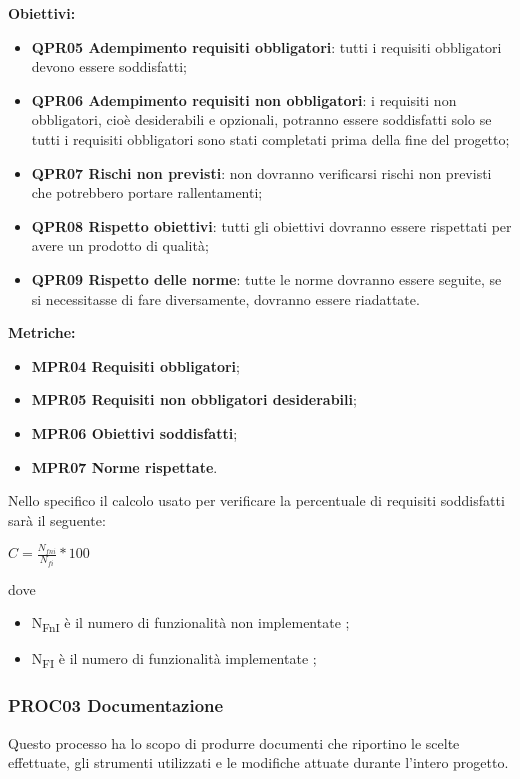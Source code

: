 \documentclass[../piano_di_qualifica.tex]{subfiles}
\begin{document}
\textbf{Obiettivi:}
\smallbreak
\begin{itemize}
	\item \textbf{QPR05 Adempimento requisiti obbligatori}: tutti i requisiti obbligatori devono essere soddisfatti;
	\item \textbf{QPR06 Adempimento requisiti non obbligatori}: i requisiti non obbligatori, cioè desiderabili e opzionali, potranno essere soddisfatti solo se tutti i requisiti obbligatori sono stati completati prima della fine del progetto;
	\item \textbf{QPR07 Rischi non previsti}: non dovranno verificarsi rischi non previsti che potrebbero portare rallentamenti;
	\item \textbf{QPR08 Rispetto obiettivi}: tutti gli obiettivi dovranno essere rispettati per avere un prodotto di qualità;
	\item \textbf{QPR09 Rispetto delle norme}: tutte le norme dovranno essere seguite, se si necessitasse di fare diversamente, dovranno essere riadattate.
\end{itemize}

\textbf{Metriche:}
\smallbreak
\begin{itemize}
	\item \textbf{MPR04 Requisiti obbligatori};
	\item \textbf{MPR05 Requisiti non obbligatori desiderabili};
	\item \textbf{MPR06 Obiettivi soddisfatti};
	\item \textbf{MPR07 Norme rispettate}.
\end{itemize}

Nello specifico il calcolo usato per verificare la percentuale di requisiti soddisfatti sarà il seguente: \par
\begin{center}
	$C = \frac{N_{fni}}{N_{fi}} * 100$
\end{center}

dove
\begin{itemize}
\item N\textsubscript{FnI} è il numero di funzionalità non implementate ;
\item N\textsubscript{FI} è il numero di funzionalità implementate ;
\end{itemize}

\subsubsection{PROC03 Documentazione}
Questo processo ha lo scopo di produrre documenti che riportino le scelte effettuate, gli strumenti utilizzati e le modifiche attuate durante l'intero progetto.
\end{document}
